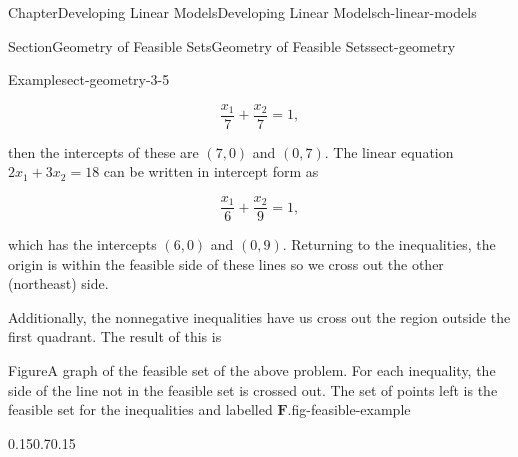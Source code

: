 \documentclass[oneside,10pt,]{book}
\numberwithin{equation}{section}
\begin{document}
\begin{chapterptx}{Chapter}{Developing Linear Models}{}{Developing Linear Models}{}{}{ch-linear-models}
\begin{sectionptx}{Section}{Geometry of Feasible Sets}{}{Geometry of Feasible Sets}{}{}{sect-geometry}
\begin{introduction}{}
\begin{example}{Example}{}{sect-geometry-3-5}
\par
%
\begin{equation*}
\frac{x_1}{7} + \frac{x_2}{7} = 1,
\end{equation*}
%
\par
then the intercepts of these are \((7,0)\) and \((0,7)\). The linear equation \(2x_1 + 3x_2 = 18\) can be written in intercept form as%
\par
%
\begin{equation*}
\frac{x_1}{6} + \frac{x_2}{9} = 1,
\end{equation*}
%
\par
which has the intercepts \((6,0)\) and \((0,9)\). Returning to the inequalities, the origin is within the feasible side of these lines so we cross out the other (northeast) side.%
\par
Additionally, the nonnegative inequalities have us cross out the region outside the first quadrant. The result of this is%
\begin{figureptx}{Figure}{A graph of the feasible set of the above problem. For each inequality, the side of the line not in the feasible set is crossed out.  The set of points left is the feasible set for the inequalities and labelled \(\boldsymbol{F}\).}{fig-feasible-example}{}%
\begin{image}{0.15}{0.7}{0.15}{}%
\end{image}
\end{figureptx}
\end{example}
\end{introduction}
\end{sectionptx}
\end{chapterptx}
\end{document}
